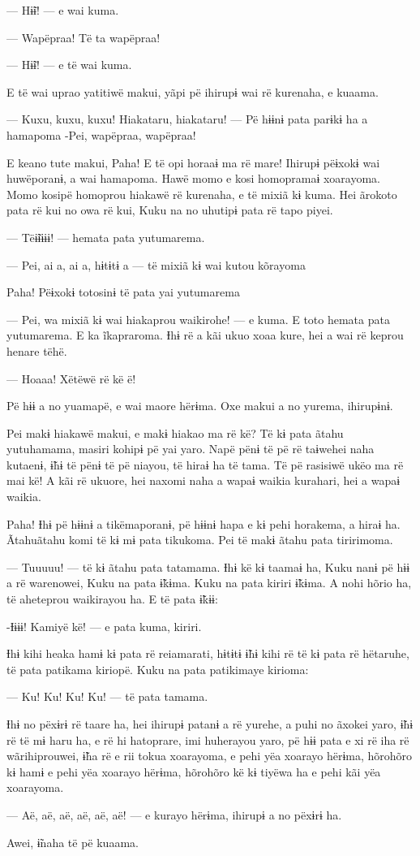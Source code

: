 — Hɨ̃ɨ! --- e wai kuma. 

— Wapëpraa! Të ta wapëpraa! 

— Hɨ̃ɨ! --- e të wai kuma. 

E të wai uprao yatitiwë makui, yãpi pë ihirupɨ wai rë kurenaha, e
kuaama. 

— Kuxu, kuxu, kuxu! Hiakataru, hiakataru! --- Pë hɨɨnɨ pata parɨkɨ ha a
hamapoma -Pei, wapëpraa, wapëpraa! 

E keano tute makui, Paha! E të opi horaaɨ ma rë mare! Ihirupɨ pëɨxokɨ
wai huwëporanɨ, a wai hamapoma. Hawë momo e kosi homopramaɨ xoarayoma.
Momo kosipë homoprou hiakawë rë kurenaha, e të mixiã kɨ kuma. Hei
ãrokoto pata rë kui no owa rë kui, Kuku na no uhutipɨ pata rë tapo
piyei. 

— Tëɨ̃ɨɨɨɨ! --- hemata pata yutumarema. 

— Pei, ai a, ai a, hɨtɨtɨ a --- të mixiã kɨ wai kutou kõrayoma 

Paha! Pëɨxokɨ totosinɨ të pata yai yutumarema 

— Pei, wa mixiã kɨ wai hiakaprou waikirohe! --- e kuma. E toto hemata
pata yutumarema. E ka ĩkapraroma. Ɨhɨ rë a kãi ukuo xoaa kure, hei a wai
rë keprou henare tëhë. 

— Hoaaa! Xëtëwë rë kë ë! 

Pë hɨɨ a no yuamapë, e wai maore hërɨma. Oxe makui a no yurema,
ihirupɨnɨ. 

Pei makɨ hiakawë makui, e makɨ hiakao ma rë kë? Të kɨ pata ãtahu
yutuhamama, masiri kohipɨ pë yai yaro. Napë pënɨ të pë rë taɨwehei naha
kutaenɨ, ɨ̃hɨ të pënɨ të pë niayou, të hiraɨ ha të tama. Të pë rasisiwë
ukëo ma rë mai kë! A kãi rë ukuore, hei naxomi naha a wapaɨ waikia
kurahari, hei a wapaɨ waikia. 

Paha! Ɨhɨ pë hɨɨnɨ a tikëmaporanɨ, pë hɨɨnɨ hapa e kɨ pehi horakema, a
hiraɨ ha. Ãtahuãtahu komi të kɨ mɨ pata tikukoma. Pei të makɨ ãtahu pata
tiririmoma. 

 

— Tuuuuu! --- të kɨ ãtahu pata tatamama. Ɨhɨ kë kɨ taamaɨ ha, Kuku nanɨ
pë hɨɨ a rë warenowei, Kuku na pata ɨ̃kɨma. Kuku na pata kiriri ɨ̃kɨma. A nohi hõrio ha, të aheteprou waikirayou ha. E të pata ɨ̃kɨɨ:

-Ɨɨɨɨ! Kamiyë kë! --- e pata kuma, kiriri. 

Ɨhɨ kihi heaka hamɨ kɨ pata rë reiamarati, hɨtɨtɨ ɨ̃hɨ kihi rë të kɨ pata
rë hëtaruhe, të pata patikama kiriopë. Kuku na pata patikimaye kirioma:

— Ku! Ku! Ku! Ku! --- të pata tamama. 

Ɨhɨ no pëxɨrɨ rë taare ha, hei ihirupɨ patanɨ a rë yurehe, a puhi no
ãxokei yaro, ɨ̃hɨ rë të mɨ haru ha, e rë hi hatoprare, imi huherayou
yaro, pë hɨɨ pata e xi rë iha rë wãrihiprouwei, ɨ̃ha rë e rii tokua
xoarayoma, e pehi yëa xoarayo hërɨma, hõrohõro kɨ hamɨ e pehi yëa
xoarayo hërɨma, hõrohõro kë kɨ tiyëwa ha e pehi kãi yëa xoarayoma. 

— Aë, aë, aë, aë, aë, aë! --- e kurayo hërɨma, ihirupɨ a no pëxɨrɨ ha. 

Awei, ɨ̃naha të pë kuaama. 

 

 

